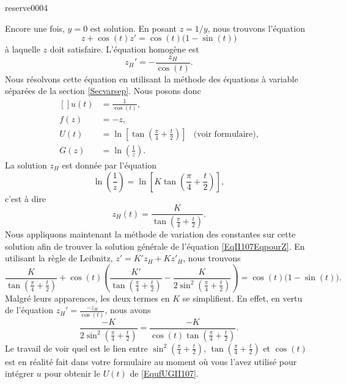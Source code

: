 \begin{corrige}{reserve0004}
\begin{enumerate}
Encore une fois, $y=0$ est solution. En posant $z=1/y$, nous trouvons l'équation
\begin{equation}		\label{EqII107EqpourZ}
	z+\cos(t)z'=\cos(t)\big(1-\sin(t)\big)
\end{equation}
à laquelle $z$ doit satisfaire. L'équation homogène est
\begin{equation}
	z_H'=-\frac{ z_H }{ \cos(t) }.
\end{equation}
Nous résolvons cette équation en utilisant la méthode des équations à variable séparées de la section \ref{Secvarsep}. Nous posons donc
\begin{equation}		\label{EqufUGII107}
	\begin{aligned}[]
		u(t)	&=\frac{1}{ \cos(t) }, \\
		f(z)	&=-z,\\
		U(t)	&=\ln\left[ \tan\left( \frac{ \pi }{ 4 }+\frac{ t }{ 2 } \right) \right]	&\text{(voir formulaire)},\\
		G(z)	&=\ln\left( \frac{1}{ z } \right).
	\end{aligned}
\end{equation}
La solution $z_H$ est donnée par l'équation
\begin{equation}
	\ln\left( \frac{1}{ z } \right)=\ln\left[ K\tan\left( \frac{ \pi }{ 4 }+\frac{ t }{ 2 } \right) \right],
\end{equation}
c'est à dire
\begin{equation}
	z_H(t)=\frac{ K }{ \tan\left( \frac{ \pi }{ 4 }+\frac{ t }{ 2 } \right) }.
\end{equation}
Nous appliquons maintenant la méthode de variation des constantes sur cette solution afin de trouver la solution générale de l'équation \eqref{EqII107EqpourZ}. En utilisant la règle de Leibnitz, $z'=K'z_H+Kz'_H$, nous trouvons
\begin{equation}
	\frac{ K }{ \tan\left( \frac{ \pi }{ 4 }+\frac{ t }{ 2 } \right) }+\cos(t)\left( \frac{ K' }{  \tan\left( \frac{ \pi }{ 4 }+\frac{ t }{ 2 } \right) }-\frac{ K }{ 2\sin^2 \left( \frac{ \pi }{ 4 }+\frac{ t }{ 2 } \right)  } \right)=\cos(t)\big( 1-\sin(t) \big).
\end{equation}
Malgré leurs apparences, les deux termes en $K$ se simplifient. En effet, en vertu de l'équation $z_H'=\frac{ -z_H }{ \cos(t) }$, nous avons
\begin{equation}
	\frac{ -K }{ 2\sin^2\left( \frac{ \pi }{ 4 }+\frac{ t }{ 2 } \right)}=\frac{ -K }{ \cos(t)\tan\left( \frac{ \pi }{ 4 }+\frac{ t }{ 2 } \right) }.
\end{equation}
Le travail de voir quel est le lien entre $\sin^2\left( \frac{ \pi }{ 4 }+\frac{ t }{ 2 } \right)$, $\tan\left( \frac{ \pi }{ 4 }+\frac{ t }{ 2 } \right)$ et $\cos(t)$ est en réalité fait dans votre formulaire au moment où vous l'avez utilisé pour intégrer $u$ pour obtenir le $U(t)$ de \eqref{EqufUGII107}.


\end{enumerate}
\end{corrige}
